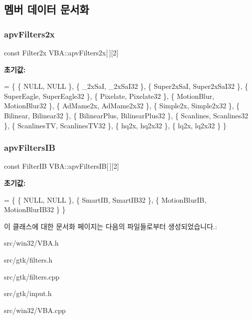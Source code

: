 \subsection{멤버 데이터 문서화}
\mbox{\label{class_v_b_a_a99a7ccca7fb310a0a3d836f999a4b738}} 
\subsubsection{\texorpdfstring{apv\+Filters2x}{apvFilters2x}}
{\footnotesize\ttfamily const Filter2x V\+B\+A\+::apv\+Filters2x\mbox{[}$\,$\mbox{]}\mbox{[}2\mbox{]}\hspace{0.3cm}{\ttfamily [static]}}

{\bfseries 초기값\+:}
\begin{DoxyCode}
=
\{
  \{ NULL,         NULL           \},
  \{ \_2xSaI,       \_2xSaI32       \},
  \{ Super2xSaI,   Super2xSaI32   \},
  \{ SuperEagle,   SuperEagle32   \},
  \{ Pixelate,     Pixelate32     \},
  \{ MotionBlur,   MotionBlur32   \},
  \{ AdMame2x,     AdMame2x32     \},
  \{ Simple2x,     Simple2x32     \},
  \{ Bilinear,     Bilinear32     \},
  \{ BilinearPlus, BilinearPlus32 \},
  \{ Scanlines,    Scanlines32    \},
  \{ ScanlinesTV,  ScanlinesTV32  \},
  \{ hq2x,         hq2x32         \},
  \{ lq2x,         lq2x32         \}
\}
\end{DoxyCode}
\mbox{\label{class_v_b_a_a146f20875aaa489ae1b57d31918f25f8}} 
\subsubsection{\texorpdfstring{apv\+Filters\+IB}{apvFiltersIB}}
{\footnotesize\ttfamily const Filter\+IB V\+B\+A\+::apv\+Filters\+IB\mbox{[}$\,$\mbox{]}\mbox{[}2\mbox{]}\hspace{0.3cm}{\ttfamily [static]}}

{\bfseries 초기값\+:}
\begin{DoxyCode}
=
\{
  \{ NULL,         NULL           \},
  \{ SmartIB,      SmartIB32      \},
  \{ MotionBlurIB, MotionBlurIB32 \}
\}
\end{DoxyCode}


이 클래스에 대한 문서화 페이지는 다음의 파일들로부터 생성되었습니다.\+:\begin{DoxyCompactItemize}
\item 
src/win32/V\+B\+A.\+h\item 
src/gtk/filters.\+h\item 
src/gtk/filters.\+cpp\item 
src/gtk/input.\+h\item 
src/win32/V\+B\+A.\+cpp\end{DoxyCompactItemize}
